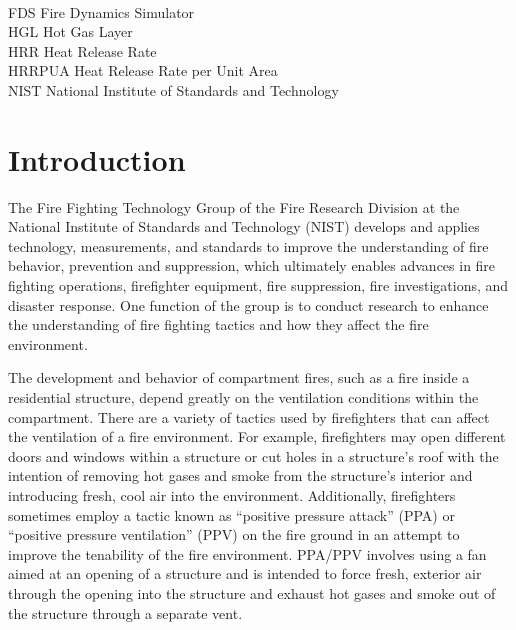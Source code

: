 \documentclass[12pt,oneside]{book}
\begin{document}
\begin{tabbing}
\hspace{1.5in} \= \\
FDS \> Fire Dynamics Simulator \\
HGL \> Hot Gas Layer \\
HRR \> Heat Release Rate \\
HRRPUA \> Heat Release Rate per Unit Area \\
NIST \> National Institute of Standards and Technology \\
\end{tabbing}

\mainmatter

\chapter{Introduction}
\label{chap:Introduction}
The Fire Fighting Technology Group of the Fire Research Division at the National Institute of Standards and Technology (NIST) develops and applies technology, measurements, and standards to improve the understanding of fire behavior, prevention and suppression, which ultimately enables advances in fire fighting operations, firefighter equipment, fire suppression, fire investigations, and disaster response. One function of the group is to conduct research to enhance the understanding of fire fighting tactics and how they affect the fire environment. 

The development and behavior of compartment fires, such as a fire inside a residential structure, depend greatly on the ventilation conditions within the compartment. There are a variety of tactics used by firefighters that can affect the ventilation of a fire environment. For example, firefighters may open different doors and windows within a structure or cut holes in a structure's roof with the intention of removing hot gases and smoke from the structure's interior and introducing fresh, cool air into the environment. Additionally, firefighters sometimes employ a tactic known as ``positive pressure attack'' (PPA) or ``positive pressure ventilation'' (PPV) on the fire ground in an attempt to improve the tenability of the fire environment. PPA/PPV involves using a fan aimed at an opening of a structure and is intended to force fresh, exterior air through the opening into the structure and exhaust hot gases and smoke out of the structure through a separate vent. 
\end{document}
